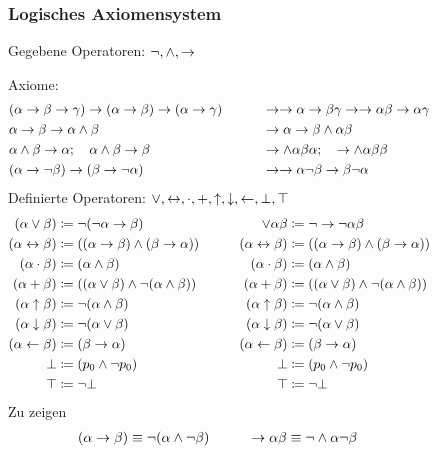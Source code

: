 \documentclass[english,ngerman,parskip=half,headsepline,footsepline,
	fleqn,notitlepage]{scrreprt}
\newcommand*{\formulatoleft}{&&&&&&&&&&}%
\newcommand*{\formulaspace}{&&&&}%
\begin{document}
	\subsubsection{Logisches Axiomensystem}%
	\label{subsub:AussagenlogischeAxiome}
	Gegebene Operatoren: $\lnot, \land, \rightarrow$\par
	Axiome:
	\begin{align}
		&(\alpha\limp\beta\limp\gamma)\limp(\alpha\limp\beta)%
			\limp(\alpha\limp\gamma)
		\formulaspace&&%
		\limp\limp\alpha\limp\beta\gamma\limp\limp\alpha\beta%
			\limp\alpha\gamma\\
		&\alpha\limp\beta\limp\alpha\land\beta
		\formulaspace&&%
		\limp\alpha\limp\beta\land\alpha\beta\\
		&\alpha\land\beta\limp\alpha ;\quad\alpha\land\beta\limp\beta
		\formulaspace&&%
		\limp\land\alpha\beta\alpha ;\quad\limp\land\alpha\beta\beta\\
		&(\alpha\limp\lnot\beta)\limp(\beta\limp\lnot\alpha)
		\formulaspace&&%
		\limp\limp\alpha\lnot\beta\limp\beta\lnot\alpha
		\formulatoleft
	\end{align}
	Definierte Operatoren: $\lor, \leftrightarrow, \cdot, +,
		\uparrow, \downarrow, \leftarrow, \bot, \top$
	\begin{align}
		(\alpha\lor\beta)&\defeq\lnot(\lnot\alpha\limp\beta)
		\formulaspace&%
		\lor\alpha\beta&\defeq\lnot\limp\lnot\alpha\beta\\
		(\alpha\lequiv\beta)&\defeq
		((\alpha\limp\beta)\land(\beta\limp\alpha))
		\formulaspace&%
		(\alpha\lequiv\beta)&\defeq((\alpha\limp\beta)%
			\land(\beta\limp\alpha))\\
		(\alpha\lmult\beta)&\defeq(\alpha\land\beta)
		\formulaspace&%
		(\alpha\lmult\beta)&\defeq(\alpha\land\beta)\\
		(\alpha\ladd\beta)&\defeq((\alpha\lor\beta)%
			\land\lnot(\alpha\land\beta))
		\formulaspace&%
		(\alpha\ladd\beta)&\defeq((\alpha\lor\beta)%
			\land\lnot(\alpha\land\beta))\\
		(\alpha\lnand\beta)&\defeq\lnot(\alpha\land\beta)
		\formulaspace&%
		(\alpha\lnand\beta)&\defeq\lnot(\alpha\land\beta)\\
		(\alpha\lnor\beta)&\defeq\lnot(\alpha\lor\beta)
		\formulaspace&%
		(\alpha\lnor\beta)&\defeq\lnot(\alpha\lor\beta)\\
		(\alpha\lrep\beta)&\defeq(\beta\limp\alpha)
		\formulaspace&%
		(\alpha\lrep\beta)&\defeq(\beta\limp\alpha)\\
		\lfalse&\defeq(p_0\land\lnot p_0)
		\formulaspace&%
		\lfalse&\defeq(p_0\land\lnot p_0)\\
		\ltrue&\defeq\lnot\lfalse
		\formulaspace&%
		\ltrue&\defeq\lnot\lfalse
		\formulatoleft
	\end{align}
	Zu zeigen
	\begin{align}
		(\alpha\limp\beta)&\equiv\lnot(\alpha\land\lnot\beta)
		\formulaspace
		&\limp\alpha\beta&\equiv\lnot\land\alpha\lnot\beta
		\formulatoleft
	\end{align}
\end{document}
